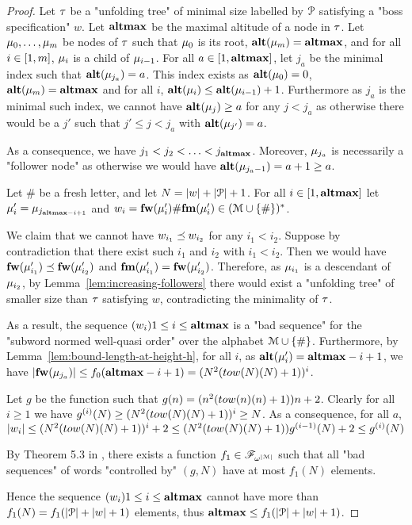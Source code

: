 \begin{proof}
	Let $\tau$ be a "unfolding tree" of minimal size labelled by $\mathcal{P}$ satisfying a "boss specification" $w$. Let $\mathbf{altmax}$ be the maximal altitude of a node in $\tau$. Let $\mu_0, \ldots, \mu_m$ be nodes of $\tau$ such that $\mu_0$ is its root, $\mathbf{alt}(\mu_m) = \mathbf{altmax}$, and for all $i\in [1,m]$, $\mu_i$ is a child of $\mu_{i-1}$.
	For all $a \in [1,\mathbf{altmax}]$, let $j_a$ be the minimal index such that $\mathbf{alt}(\mu_{j_a}) = a$. This index exists as $\mathbf{alt}(\mu_0) = 0$, $\mathbf{alt}(\mu_m) = \mathbf{altmax}$ and for all $i$, $\mathbf{alt}(\mu_{i}) \leq \mathbf{alt}(\mu_{i-1})+1$.
	Furthermore as $j_a$ is the minimal such index, we cannot have $\mathbf{alt}(\mu_j) \geq a$ for any $j < j_a$ as otherwise there would be a $j'$ such that $j' \leq j < j_a$ with $\mathbf{alt}(\mu_{j'}) = a$.
	
	As a consequence, we have $j_1 < j_2 < \ldots < j_{\mathbf{altmax}}$. Moreover, $\mu_{j_a}$ is necessarily a "follower node" as otherwise we would have $\mathbf{alt}(\mu_{j_a-1}) = a+1 \geq a$.
	
	Let $\#$ be a fresh letter, and let $N = |w| + |\mathcal{P}|+1$. For all $i \in [1,\mathbf{altmax}]$ let $\mu'_i = \mu_{j_{\mathbf{altmax} - i+1}}$ and $w_i = \mathbf{fw}(\mu'_{i}) \# \mathbf{fm}(\mu'_{i}) \in (\mathcal{M} \cup \{\#\})^*$.
	
	We claim that we cannot have $w_{i_1}\preceq w_{i_2}$ for any  $i_1< i_2$.
	Suppose by contradiction that there exist such $i_1$ and $i_2$ with $i_1 < i_2$. Then we would have $\mathbf{fw}(\mu'_{i_1}) \preceq \mathbf{fw}(\mu'_{i_2})$ and $\mathbf{fm}(\mu'_{i_1}) = \mathbf{fw}(\mu'_{i_2})$.
	Therefore, as $\mu_{i_1}$ is a descendant of $\mu_{i_2}$, by Lemma~\ref{lem:increasing-followers} there would exist a "unfolding tree" of smaller size than $\tau$ satisfying $w$, contradicting the minimality of $\tau$.
	
	As a result, the sequence $(w_i){1\leq i \leq \mathbf{altmax}}$ is a "bad sequence" for the "subword normed well-quasi order" over the alphabet $\mathcal{M}\cup\{\#\}$.
	Furthermore, by Lemma~\ref{lem:bound-length-at-height-h}, for all $i$, as $\mathbf{alt}(\mu'_{i}) = \mathbf{altmax}-i+1$, we have $\size{\followlabelword{\node_{j_a}}} \leq f_0(\altmax-i+1) = (N^2(\towerfun(N)(N)+1))^{i}$.
	
	Let $g$ be the function such that $g(n) = (n^2(\towerfun(n)(n)+1))n+2$. Clearly for all $i\geq 1$ we have $g^{(i)}(N) \geq (N^2(\towerfun(N)(N)+1))^{i} \geq N$.
	As a consequence, for all $a$, $\size{w_i} \leq (N^2(\towerfun(N)(N)+1))^{i} + 2 \leq (N^2(\towerfun(N)(N)+1)) g^{(i-1)}(N) + 2 \leq g^{(i)}(N)$
	
	By Theorem 5.3 in \cite{SchmitzS2011upperHigman}, there exists a function $f_1 \in \mathscr{F}_{\omega^{|\mathcal{M}|}}$ such that all  "bad sequences" of words "controlled by" $(g,N)$ have at most $f_1(N)$ elements.
	
	Hence the sequence $(w_i){1\leq i \leq \mathbf{altmax}}$ cannot have more than $f_1(N) = f_1(|\mathcal{P}| + |w| + 1)$ elements, thus $\mathbf{altmax} \leq f_1(|\mathcal{P}| + |w| + 1)$.
\end{proof}


